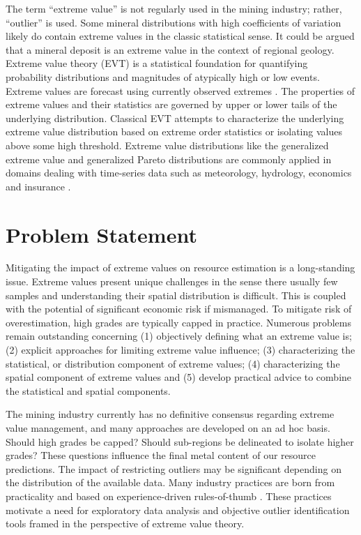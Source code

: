 The term ``extreme value'' is not regularly used in the mining industry; rather, ``outlier'' is used. Some mineral distributions with high coefficients of variation likely do contain extreme values in the classic statistical sense. It could be argued that a mineral deposit is an extreme value in the context of regional geology. Extreme value theory (EVT) is a statistical foundation for quantifying probability distributions and magnitudes of atypically high or low events. Extreme values are forecast using currently observed extremes \citep{gumbel1958statistics}. The properties of extreme values and their statistics are governed by upper or lower tails of the underlying distribution. Classical EVT attempts to characterize the underlying extreme value distribution based on extreme order statistics or isolating values above some high threshold. Extreme value distributions like the generalized extreme value and generalized Pareto distributions are commonly applied in domains dealing with time-series data such as meteorology, hydrology, economics and insurance \citep{reiss2007statistical}.


\FloatBarrier
\section{Problem Statement}
\label{sec:01problem}

Mitigating the impact of extreme values on resource estimation is a long-standing issue. Extreme values present unique challenges in the sense there usually few samples and understanding their spatial distribution is difficult. This is coupled with the potential of significant economic risk if mismanaged. To mitigate risk of overestimation, high grades are typically capped in practice. Numerous problems remain outstanding concerning (1) objectively defining what an extreme value is; (2) explicit approaches for limiting extreme value influence; (3) characterizing the statistical, or distribution component of extreme values; (4) characterizing the spatial component of extreme values and (5) develop practical advice to combine the statistical and spatial components.

The mining industry currently has no definitive consensus regarding extreme value management, and many approaches are developed on an ad hoc basis. Should high grades be capped? Should sub-regions be delineated to isolate higher grades? These questions influence the final metal content of our resource predictions. The impact of restricting outliers may be significant depending on the distribution of the available data. Many industry practices are born from practicality and based on experience-driven rules-of-thumb \citep{nowak2013suggestions}. These practices motivate a need for exploratory data analysis and objective outlier identification tools framed in the perspective of extreme value theory.

